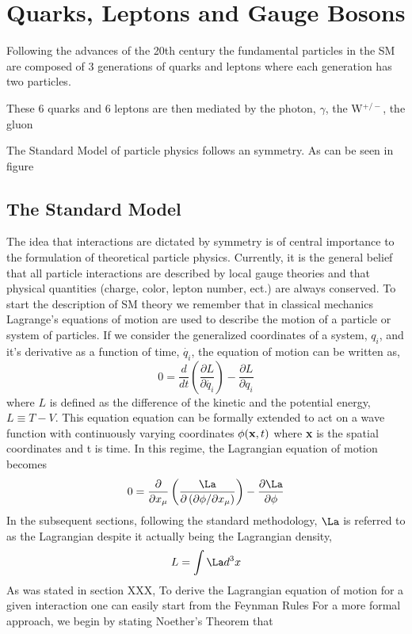 \section{Quarks, Leptons and Gauge Bosons}
Following the advances of the 20th century the fundamental
particles in the SM are composed of 3 generations of quarks and leptons
where each generation has two particles. 

These 6 quarks and 6 leptons
are then mediated by the photon, $\gamma$, the W$^{+/-}$, the gluon

The Standard Model of particle physics follows an %
symmetry. As can be seen in figure %
\subsection{The Standard Model}%
The idea that interactions are dictated by symmetry is of central
importance to the formulation of theoretical particle physics. 
Currently, it is the general belief that all particle interactions are
described by local gauge theories and that 
physical quantities (charge, color, lepton number, ect.) are 
always conserved.
To start the description of SM theory we remember that in classical 
mechanics Lagrange's equations of motion are used to
describe the motion of a particle or system of particles. %
If we consider the generalized coordinates of a system, $q_{i}$,
and it's derivative as a function of time, $\dot{q_{i}}$, the equation
of motion can be written as,
\begin{equation}
0=\frac{d}{dt}\left(\frac{\partial L}{\partial\dot{q_{i}}}\right) - \frac{\partial L}{\partial q_{i}}
\end{equation}
where $L$ is defined as the difference of the kinetic and the potential energy, $L\equiv T-V$.
This equation equation can be formally extended to act on a wave function with %
continuously varying coordinates $\phi({\bf x},t)$
where {\bf x} is the spatial coordinates and t is time.
In this regime, the Lagrangian equation of motion becomes
\begin{equation}
0=\frac{\partial}{\partial x_{\mu}}\left( \frac{\La}{\partial\left(\partial\phi/\partial x_{\mu}\right)}\right)-\frac{\partial\La}{\partial\phi}
\end{equation}
In the subsequent sections, following the standard methodology, $\La$ is referred to as the Lagrangian
despite it actually being the Lagrangian density,
\begin{equation}
L=\int{\La d^{3}x}
\end{equation}
As was stated in section XXX,%
To derive the Lagrangian equation of motion for a given interaction
one can easily start from the Feynman Rules %
For a more formal approach, we begin by stating Noether's
Theorem that 

